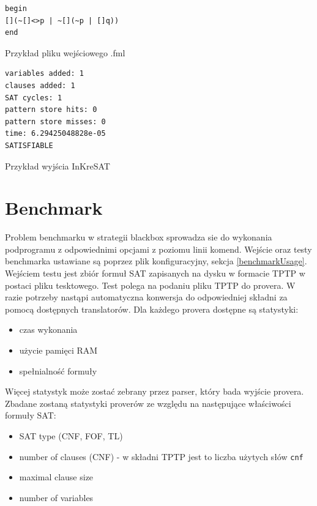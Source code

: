 \documentclass[a4paper,12pt]{article}
\newenvironment{longlisting}{\captionsetup{type=listing}}{}
\begin{document}

\begin{longlisting}
  \begin{verbatim}
begin
[](~[]<>p | ~[](~p | []q))
end
  \end{verbatim}
   \caption{Przykład pliku wejściowego .fml}
\end{longlisting}

\begin{longlisting}

  \begin{verbatim}
variables added: 1
clauses added: 1
SAT cycles: 1
pattern store hits: 0
pattern store misses: 0
time: 6.29425048828e-05
SATISFIABLE
  \end{verbatim}
   \caption{Przykład wyjścia InKreSAT}
\end{longlisting}

\section{Benchmark}

Problem benchmarku w strategii blackbox sprowadza sie do wykonania podprogramu z odpowiednimi opcjami z poziomu linii komend.
Wejście oraz testy benchmarka ustawiane są poprzez plik konfiguracyjny, sekcja \ref{benchmarkUsage}.  Wejściem testu jest zbiór formuł \gls{SAT} zapisanych na dysku w formacie TPTP w postaci pliku tesktowego. Test polega na podaniu pliku TPTP do provera. W razie potrzeby nastąpi automatyczna konwersja do odpowiedniej składni za pomocą dostępnych translatorów.
Dla każdego provera dostępne są statystyki:

\begin{itemize}
  \item czas wykonania
  \item użycie pamięci RAM
  \item spełnialność formuły
\end{itemize}

\noindent
Więcej statystyk może zostać zebrany przez parser, który bada wyjście provera.
\newline
Zbadane zostaną statystyki proverów ze względu na następujące właściwości formuły SAT:

\begin{itemize}
  \item SAT type (CNF, FOF, TL)
  \item number of clauses (CNF) - w składni TPTP jest to liczba użytych słów \texttt{cnf}
  \item maximal clause size
  \item number of variables
\end{itemize}
\end{document}
